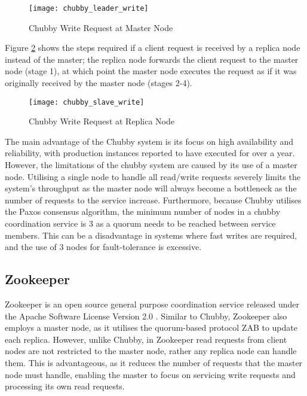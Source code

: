 	\begin{figure}[htbp!] 
	    \centering    
	    \texttt{[image: chubby\_leader\_write]}
	    \caption[Chubby Write Request at Master Node]{Chubby Write Request at Master Node}
	    \label{fig:chubby_leader_write}
	\end{figure}	 

Figure \ref{fig:chubby_slave_write} shows the steps required if a client request is received by a replica node instead of the master; the replica node forwards the client request to the master node (stage 1), at which point the master node executes the request as if it was originally received by the master node (stages 2-4).

	\begin{figure}[htbp!] 
	    \centering    
	    \texttt{[image: chubby\_slave\_write]}
	    \caption[Chubby Write Request at Replica Node]{Chubby Write Request at Replica Node}
	    \label{fig:chubby_slave_write}
	\end{figure}	 

The main advantage of the Chubby system is its focus on high availability and reliability, with production instances reported to have executed for over a year. However, the limitations of the chubby system are caused by its use of a master node. Utilising a single node to handle all read/write requests severely limits the system's throughput as the master node will always become a bottleneck as the number of requests to the service increase.  Furthermore, because Chubby utilises the Paxos consensus algorithm, the minimum number of nodes in a chubby coordination service is 3 as a quorum needs to be reached between service members.  This can be a disadvantage in systems where fast writes are required, and the use of 3 nodes for fault-tolerance is excessive.  
	
	\subsection{Zookeeper}
	Zookeeper\citep{Hunt:2010:ZWC:1855840.1855851} is an open source general purpose coordination service released under the Apache Software License Version 2.0 \citep{ApacheLicense}. Similar to Chubby, Zookeeper also employs a master node, as it utilises the quorum-based protocol ZAB\citep{Junqueira:2011:ZHB:2056308.2056409} to update each replica.  However, unlike Chubby, in Zookeeper read requests from client nodes are not restricted to the master node, rather any replica node can handle them.  This is advantageous, as it reduces the number of requests that the master node must handle, enabling the master to focus on servicing write requests and processing its own read requests.  
	
